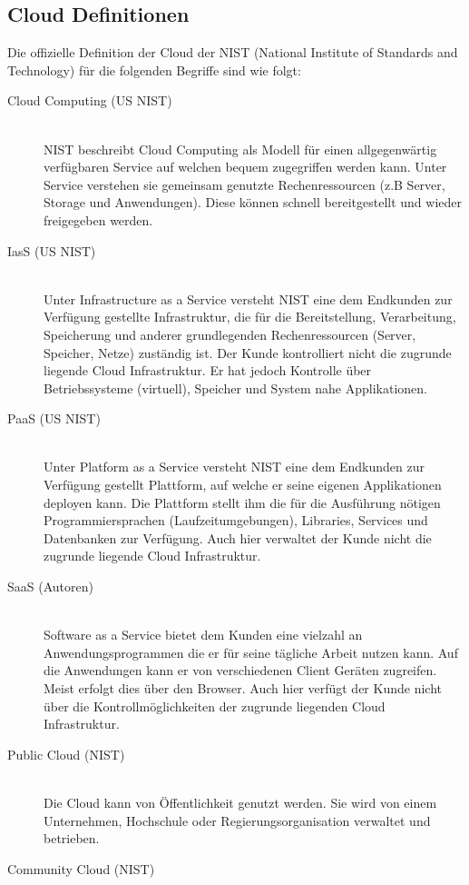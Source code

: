 \subsection{Cloud Definitionen}
Die offizielle Definition der Cloud der NIST (National Institute of Standards and Technology) für die folgenden Begriffe sind wie folgt:
\begin{description}
	\item[Cloud Computing (US NIST)]  \hfill \\
	NIST beschreibt Cloud Computing als Modell für einen allgegenwärtig verfügbaren Service auf welchen bequem zugegriffen werden kann. Unter Service verstehen sie gemeinsam genutzte Rechenressourcen (z.B Server, Storage und Anwendungen). Diese können schnell bereitgestellt und wieder freigegeben werden. 
	\item[IasS (US NIST)]  \hfill \\
	Unter Infrastructure as a Service versteht NIST eine dem Endkunden zur Verfügung gestellte Infrastruktur, die für die Bereitstellung, Verarbeitung, Speicherung und anderer grundlegenden Rechenressourcen (Server, Speicher, Netze) zuständig ist. Der Kunde kontrolliert nicht die zugrunde liegende Cloud Infrastruktur. Er hat jedoch Kontrolle über Betriebssysteme (virtuell), Speicher und System nahe Applikationen.
	\item[PaaS (US NIST)]  \hfill \\
	Unter Platform as a Service versteht NIST eine dem Endkunden zur Verfügung gestellt Plattform, auf welche er seine eigenen Applikationen deployen kann. Die Plattform stellt ihm die für die Ausführung nötigen Programmiersprachen (Laufzeitumgebungen), Libraries, Services und Datenbanken zur Verfügung. Auch hier verwaltet der Kunde nicht die zugrunde liegende Cloud Infrastruktur. 
	\item[SaaS (Autoren)]  \hfill \\
	Software as a Service bietet dem Kunden eine vielzahl an Anwendungsprogrammen die er für seine tägliche Arbeit nutzen kann. Auf die Anwendungen kann er von verschiedenen Client Geräten zugreifen. Meist erfolgt dies über den Browser. Auch hier verfügt der Kunde nicht über die Kontrollmöglichkeiten der zugrunde liegenden Cloud Infrastruktur. 
	\item[Public Cloud (NIST)]  \hfill \\
	Die Cloud kann von Öffentlichkeit genutzt werden. Sie wird von einem Unternehmen, Hochschule oder Regierungsorganisation verwaltet und betrieben.
	\item[Community Cloud (NIST)]  \hfill \\

\end{description}
